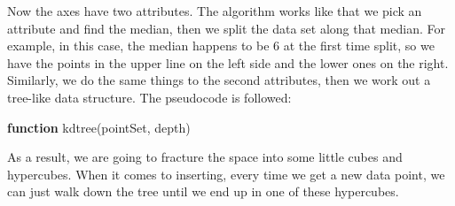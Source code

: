 \documentclass[12pt, a4paper]{article}
\begin{document}
        Now the axes have two attributes. The algorithm works like that we pick an attribute and find the median, then we split the data set along that median. For example, in this case, the median happens to be 6 at the first time split, so we have the points in the upper line on the left side and the lower ones on the right. Similarly, we do the same things to the second attributes, then we work out a tree-like data structure. The pseudocode is followed:

        \begin{algorithm}[ht]
            {\bf function} kdtree(pointSet, depth)\\
        \end{algorithm}

        As a result, we are going to fracture the space into some little cubes and hypercubes. When it comes to inserting, every time we get a new data point, we can just walk down the tree until we end up in one of these hypercubes.
\end{document}
